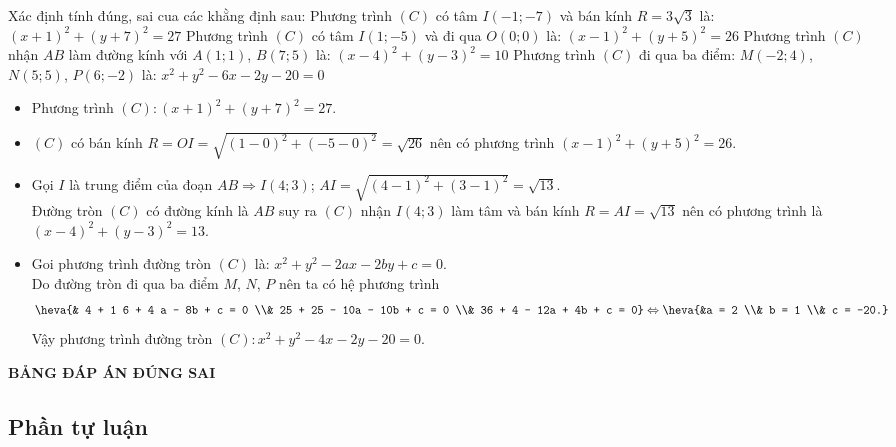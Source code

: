 \begin{ex}%
	Xác định tính đúng, sai cua các khằng định sau:
	\choiceTF
	{\True Phương trình $(C)$ có tâm $I(-1 ;-7)$ và bán kính $R = 3 \sqrt{3}$ là: $(x + 1)^2 + (y + 7)^2 = 27$}
	{\True Phương trình $(C)$ có tâm $I(1 ;-5)$ và đi qua $O(0 ; 0)$ là: $(x - 1)^2 + (y+5)^2 = 26$}
	{Phương trình $(C)$ nhận $A B$ làm đường kính với $A(1 ; 1)$, $B(7 ; 5)$ là: $(x-4)^2+(y-3)^2=10$}
	{Phương trình $(C)$ đi qua ba điểm: $M(-2 ; 4)$, $N(5 ; 5)$, $P(6 ;-2)$ là: $x^2 + y^2 - 6x - 2y - 20 = 0$}
	\loigiai
	{
		\begin{itemize}
			\item Phương trình $(C) \colon (x + 1)^2 + (y + 7)^2 = 27$.
			\item $(C)$ có bán kính $R = OI = \sqrt{(1-0)^2 + (-5-0)^2} = \sqrt{26}$ nên có phương trình $(x-1)^2 + (y+5)^2 = 26$.
			\item Gọi $I$ là trung điểm của đoạn $AB \Rightarrow I(4 ; 3)$; $AI = \sqrt{(4-1)^2 + (3-1)^2} = \sqrt{13}$.\\
			Đường tròn $(C)$ có đường kính là $AB$ suy ra $(C)$ nhận $I(4 ; 3)$ làm tâm và bán kính $R = AI = \sqrt{13}$ nên có phương trình là $(x-4)^2 + (y-3)^2 = 13$.
			\item Goi phương trình đường tròn $(C)$ là: $x^2 + y^2 - 2ax - 2by + c = 0$.\\
			Do đường tròn đi qua ba điểm $M$, $N$, $P$ nên ta có hệ phương trình
			$$\heva{& 4 + 1 6 + 4 a - 8b + c = 0 \\& 25 + 25 - 10a - 10b + c = 0 \\& 36 + 4 - 12a + 4b + c = 0}
			\Leftrightarrow \heva{&a = 2 \\& b = 1 \\& c = -20.}$$
			Vậy phương trình đường tròn $(C) \colon x^2 + y^2 - 4x - 2y - 20 = 0$.
		\end{itemize}
	}
\end{ex}


\begin{center}
	\textbf{\textsf{BẢNG ĐÁP ÁN ĐÚNG SAI}}
\end{center}


\subsection{Phần tự luận}

